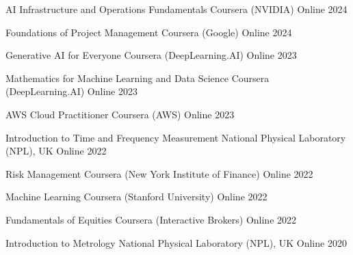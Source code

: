 



\begin{cvhonors}


  \cvhonor
    {AI Infrastructure and Operations Fundamentals} %
    {Coursera (NVIDIA)} %
    {Online} %
    {2024} %

  \cvhonor
    {Foundations of Project Management} %
    {Coursera (Google)} %
    {Online} %
    {2024} %

  \cvhonor
    {Generative AI for Everyone} %
    {Coursera (DeepLearning.AI)} %
    {Online} %
    {2023} %

  \cvhonor
    {Mathematics for Machine Learning and Data Science} %
    {Coursera (DeepLearning.AI)} %
    {Online} %
    {2023} %

  \cvhonor
    {AWS Cloud Practitioner} %
    {Coursera (AWS)} %
    {Online} %
    {2023} %

  \cvhonor
    {Introduction to Time and Frequency Measurement} %
    {National Physical Laboratory (NPL), UK} %
    {Online} %
    {2022} %

  \cvhonor
    {Risk Management} %
    {Coursera (New York Institute of Finance)} %
    {Online} %
    {2022} %

  \cvhonor
    {Machine Learning} %
    {Coursera (Stanford University)} %
    {Online} %
    {2022} %

  \cvhonor
    {Fundamentals of Equities} %
    {Coursera (Interactive Brokers)} %
    {Online} %
    {2022} %

  \cvhonor
    {Introduction to Metrology} %
    {National Physical Laboratory (NPL), UK} %
    {Online} %
    {2020} %


\end{cvhonors}
